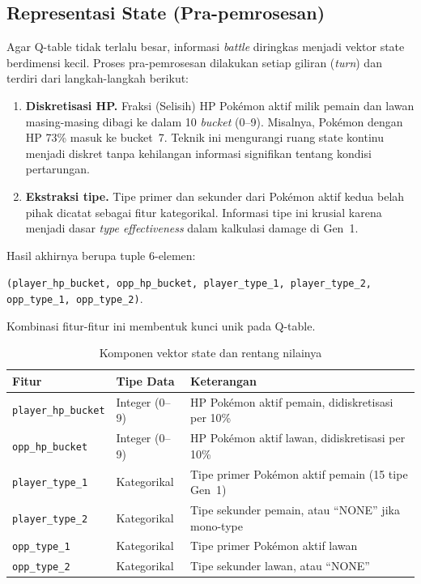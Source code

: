 \documentclass[11pt,a4paper,oneside]{report}
\begin{document}
\subsection*{Representasi State (Pra-pemrosesan)}

Agar Q-table tidak terlalu besar, informasi \textit{battle} diringkas menjadi vektor state berdimensi kecil. Proses pra-pemrosesan dilakukan setiap giliran (\textit{turn}) dan terdiri dari langkah-langkah berikut:

\begin{enumerate}[leftmargin=*]
    \item \textbf{Diskretisasi HP.} Fraksi (Selisih) HP Pokémon aktif milik pemain dan lawan masing-masing dibagi ke dalam 10 \textit{bucket} (0--9). Misalnya, Pokémon dengan HP 73\% masuk ke bucket~7. Teknik ini mengurangi ruang state kontinu menjadi diskret tanpa kehilangan informasi signifikan tentang kondisi pertarungan.
    \item \textbf{Ekstraksi tipe.} Tipe primer dan sekunder dari Pokémon aktif kedua belah pihak dicatat sebagai fitur kategorikal. Informasi tipe ini krusial karena menjadi dasar \textit{type effectiveness} dalam kalkulasi damage di Gen~1.
\end{enumerate}

Hasil akhirnya berupa tuple 6-elemen: 

\texttt{(player\_hp\_bucket, opp\_hp\_bucket, player\_type\_1, player\_type\_2, opp\_type\_1, opp\_type\_2)}. 

Kombinasi fitur-fitur ini membentuk kunci unik pada Q-table.

\begin{table}[h!]
\centering
\caption{Komponen vektor state dan rentang nilainya}
\label{tab:state-features}
\begin{tabular}{llp{6.5cm}}
\toprule
\textbf{Fitur} & \textbf{Tipe Data} & \textbf{Keterangan} \\
\midrule
\texttt{player\_hp\_bucket}  & Integer (0--9) & HP Pokémon aktif pemain, didiskretisasi per 10\% \\
\texttt{opp\_hp\_bucket}     & Integer (0--9) & HP Pokémon aktif lawan, didiskretisasi per 10\% \\
\texttt{player\_type\_1}     & Kategorikal    & Tipe primer Pokémon aktif pemain (15 tipe Gen~1) \\
\texttt{player\_type\_2}     & Kategorikal    & Tipe sekunder pemain, atau ``NONE'' jika mono-type \\
\texttt{opp\_type\_1}        & Kategorikal    & Tipe primer Pokémon aktif lawan \\
\texttt{opp\_type\_2}        & Kategorikal    & Tipe sekunder lawan, atau ``NONE'' \\
\bottomrule
\end{tabular}
\end{table}
\end{document}
